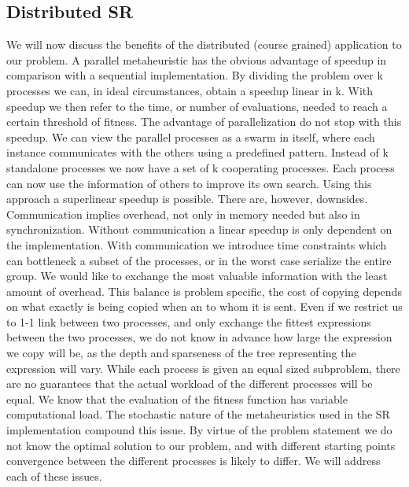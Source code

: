 \subsection{Distributed SR}
We will now discuss the benefits of the distributed (course grained) application to our problem.
A parallel metaheuristic has the obvious advantage of speedup in comparison with a sequential implementation. By dividing the problem over k processes we can, in ideal circumstances, obtain a speedup linear in k. With speedup we then refer to the time, or number of evaluations, needed to reach a certain threshold of fitness. The advantage of parallelization do not stop with this speedup. We can view the parallel processes as a swarm in itself, where each instance communicates with the others using a predefined pattern. Instead of k standalone processes we now have a set of k cooperating  processes. Each process can now use the information of others to improve its own search. Using this approach a superlinear speedup is possible. There are, however, downsides. Communication implies overhead, not only in memory needed but also in synchronization. Without communication a linear speedup is only dependent on the implementation. 
With communication we introduce time constraints which can bottleneck a subset of the processes, or in the worst case serialize the entire group. We would like to exchange the most valuable information with the least amount of overhead. This balance is problem specific, the cost of copying depends on what exactly is being copied when an to whom it is sent. Even if we restrict us to 1-1 link between two processes, and only exchange the fittest expressions between the two processes, we do not know in advance how large the expression we copy will be, as the depth and sparseness of the tree representing the expression will vary.
While each process is given an equal sized subproblem, there are no guarantees that the actual workload of the different processes will be equal. We know that the evaluation of the fitness function has variable computational load. The stochastic nature of the metaheuristics used in the SR implementation compound this issue. By virtue of the problem statement we do not know the optimal 
solution to our problem, and with different starting points convergence between the different processes is likely to differ. We will address each of these issues.

